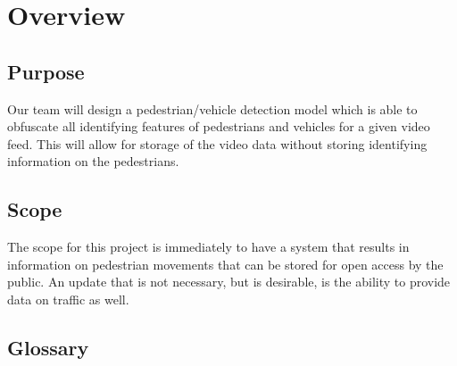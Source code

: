 \documentclass[onecolumn, draftclsnofoot,10pt, compsoc]{IEEEtran}
\begin{document}
\newpage
{}
\tableofcontents
\clearpage


\section{Overview}
\subsection{Purpose}
Our team will design a pedestrian/vehicle detection model which is able to obfuscate all identifying features of pedestrians and vehicles for a given video feed. This will allow for storage of the video data without storing identifying information on the pedestrians.
\subsection{Scope}
The scope for this project is immediately to have a system that results in information on pedestrian movements that can be stored for open access by the public. An update that is not necessary, but is desirable, is the ability to provide data on traffic as well.
\subsection{Glossary}
\end{document}
